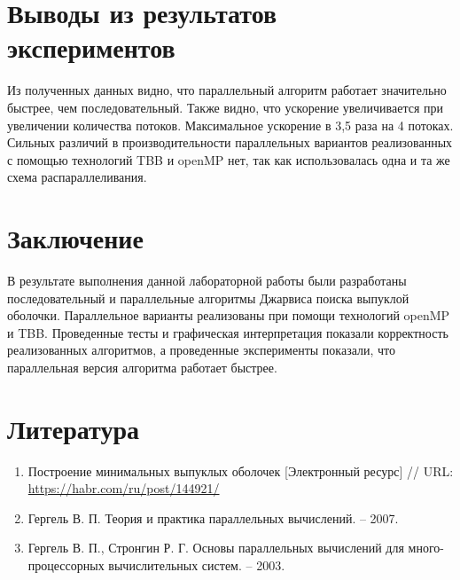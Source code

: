 \documentclass{report}
\begin{document}
\section*{Выводы из результатов экспериментов}
\par Из полученных данных видно, что параллельный алгоритм работает значительно быстрее, чем последовательный. Также видно, что ускорение увеличивается при увеличении количества потоков. Максимальное ускорение в 3,5 раза на 4 потоках. Сильных различий в производительности параллельных вариантов реализованных с помощью технологий TBB и openMP нет, так как использовалась одна и та же схема распараллеливания.

\newpage

\newpage

\section*{Заключение}
В результате выполнения   данной лабораторной работы были разработаны последовательный и параллельные алгоритмы Джарвиса поиска выпуклой оболочки. Параллельное варианты реализованы при помощи технологий openMP и TBB. Проведенные тесты и графическая интерпретация показали корректность реализованных алгоритмов, а проведенные эксперименты показали, что параллельная версия алгоритма работает быстрее.

\newpage

\section*{Литература}
\begin{enumerate}
\item Построение минимальных выпуклых оболочек [Электронный ресурс] // URL: \url{https://habr.com/ru/post/144921/}
\item Гергель В. П. Теория и практика параллельных вычислений. – 2007.
\item  Гергель В. П., Стронгин Р. Г. Основы параллельных вычислений для много-
процессорных вычислительных систем. – 2003.
\end{enumerate} 
\newpage

\end{document}
